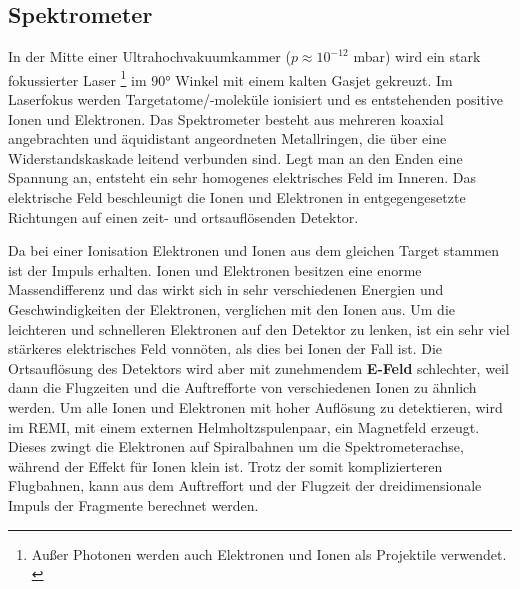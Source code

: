 \subsection{Spektrometer} \label{sec:Spektrometer} 

In der Mitte einer Ultrahochvakuumkammer ($p \approx 10^{-12}$ mbar) wird ein stark fokussierter Laser \footnote{\label{foot:1}Außer Photonen werden auch Elektronen und Ionen als Projektile verwendet. \cite{ullrich2003}} im 90° Winkel mit einem kalten Gasjet gekreuzt. Im Laserfokus werden Targetatome/-moleküle ionisiert und es entstehenden positive Ionen und Elektronen.
%
Das Spektrometer besteht aus mehreren koaxial angebrachten und äquidistant angeordneten Metallringen, die über eine Widerstandskaskade leitend verbunden sind. Legt man an den Enden eine Spannung an, entsteht ein sehr homogenes elektrisches Feld im Inneren. Das elektrische Feld beschleunigt die Ionen und Elektronen in entgegengesetzte Richtungen auf einen zeit- und ortsauflösenden Detektor. 
%
%
%

Da bei einer Ionisation Elektronen und Ionen aus dem gleichen Target stammen ist der Impuls erhalten. Ionen und Elektronen besitzen eine enorme Massendifferenz %
und das wirkt sich in sehr verschiedenen Energien und Geschwindigkeiten der Elektronen, verglichen mit den Ionen aus. Um die leichteren und schnelleren Elektronen auf den Detektor zu lenken, ist  ein sehr viel stärkeres elektrisches Feld vonnöten, als dies bei Ionen der Fall ist. Die Ortsauflösung des Detektors wird aber mit zunehmendem \textbf{E-Feld} schlechter, weil dann die Flugzeiten und die Auftrefforte von verschiedenen Ionen zu ähnlich werden.
Um alle Ionen und Elektronen mit hoher Auflösung zu detektieren, wird im REMI, mit einem externen Helmholtzspulenpaar, ein Magnetfeld erzeugt. Dieses zwingt die Elektronen auf Spiralbahnen um die Spektrometerachse, während der Effekt für Ionen klein ist. Trotz der somit komplizierteren Flugbahnen, kann aus dem Auftreffort und der Flugzeit der dreidimensionale Impuls der Fragmente berechnet werden. 

